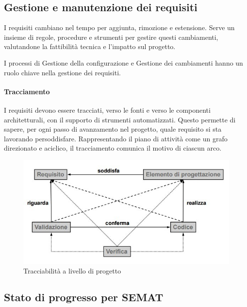 \subsection{Gestione e manutenzione dei requisiti}
\label{ssub:gestione_e_manutenzione_dei_prodotti}

I requisiti cambiano nel tempo per aggiunta, rimozione e estensione. Serve un
insieme di regole, procedure e strumenti per gestire questi cambiamenti,
valutandone la fattibilità tecnica e l'impatto sul progetto.

I processi di Gestione della configurazione e Gestione dei cambiamenti hanno un
ruolo chiave nella gestione dei requisiti.

\paragraph{Tracciamento}
\label{par:tracciamento}

I requisiti devono essere tracciati, verso le fonti e verso le componenti
architetturali, con il supporto di strumenti automatizzati. Questo permette di
sapere, per ogni passo di avanzamento nel progetto, quale requisito si sta
lavorando persoddisfare. Rappresentando il piano di attività come un grafo
direzionato e aciclico, il tracciamento comunica il motivo di ciascun arco.

\begin{figure}[h!]
  \centering
  \includegraphics[scale=0.5]{imgs/traceability}
  \caption{Tracciabilità a livello di progetto}
\end{figure}


\subsection{Stato di progresso per SEMAT}
\label{sub:stato_di_progresso_per_semat}


